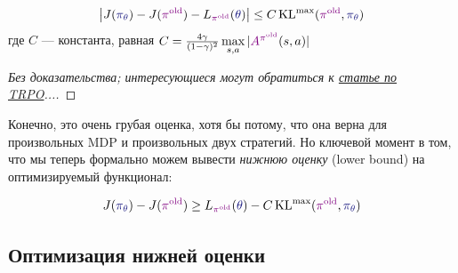\begin{theoremBox}[label=th:Lapproximationestimation]{}
\,
\begin{equation*} 
\left| J(\textcolor{ChadBlue}{\pi_\theta}) - J(\textcolor{ChadPurple}{\pi^{\old}}) - L_{\textcolor{ChadPurple}{\pi^{\old}}}(\textcolor{ChadBlue}{\theta}) \right| \le C \KL^{\max}(\textcolor{ChadPurple}{\pi^{\old}}, \textcolor{ChadBlue}{\pi_{\theta}})
\end{equation*}
где $C$ --- константа, равная $C \HM= \frac{4 \gamma}{(1 - \gamma)^2} \max\limits_{s, a} |\textcolor{ChadPurple}{A^{\pi^{\old}}}(s, a)|$
\begin{proof}[Без доказательства; интересующиеся могут обратиться к \href{https://arxiv.org/abs/1502.05477}{статье по TRPO}...]
\end{proof}
\end{theoremBox}

Конечно, это очень грубая оценка, хотя бы потому, что она верна для произвольных MDP и произвольных двух стратегий. Но ключевой момент в том, что мы теперь формально можем вывести \emph{нижнюю оценку} (lower bound) на оптимизируемый функционал:
\begin{theorem}
\begin{equation}\label{lowerbound}
J(\textcolor{ChadBlue}{\pi_\theta}) - J(\textcolor{ChadPurple}{\pi^{\old}}) \ge L_{\textcolor{ChadPurple}{\pi^{\old}}}(\textcolor{ChadBlue}{\theta}) - C \KL^{\max}(\textcolor{ChadPurple}{\pi^{\old}}, \textcolor{ChadBlue}{\pi_{\theta}})
\end{equation}
\end{theorem}

\subsection{Оптимизация нижней оценки}

